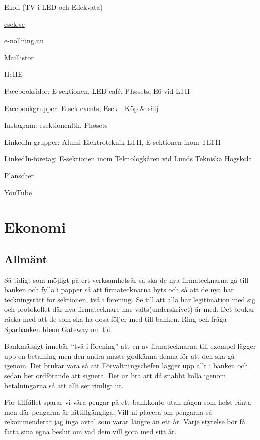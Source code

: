\documentclass[10pt]{article}
\begin{document}
\begin{dashlist}
    \item Ekoli (TV i LED och Edekvata)
    \item \url{esek.se}
    \item \url{e-nollning.nu}
    \item Maillistor
    \item HeHE
    \item Facebooksidor: E-sektionen, LED-café, Ph\o sets, E6 vid LTH
    \item Facebookgrupper: E-sek events, Esek - Köp \& sälj
    \item Instagram: esektionenlth, Ph\o sets
    \item LinkedIn-grupper: Alumi Elektroteknik LTH, E-sektionen inom TLTH
    \item LinkedIn-företag: E-sektionen inom Teknologkåren vid Lunds Tekniska Högskola
    \item Planscher
    \item YouTube
\end{dashlist}

\section{Ekonomi}

\subsection{Allmänt}

Så tidigt som möjligt på ert verksamhetsår så ska de nya firmatecknarna gå till banken och fylla i papper så att firmatecknarna byts och så att de nya har teckningsrätt för sektionen, två i förening. Se till att alla har legitimation med sig och protokollet där nya firmatecknare har valts(underskrivet) är med. Det brukar räcka med att de som ska ha dosa följer med till banken. Ring och fråga Sparbanken Ideon Gateway om tid.

Bankmässigt innebär ``två i förening'' att en av firmatecknarna till exempel lägger upp en betalning men den andra måste godkänna denna för att den ska gå igenom. Det brukar vara så att Förvaltningschefen lägger upp allt i banken och sedan ber ordförande att signera. Det är bra att då snabbt kolla igenom betalningarna så att allt ser rimligt ut.

För tillfället sparar vi våra pengar på ett bankkonto utan någon som helst ränta men där pengarna är lättillgängliga. Vill ni placera om pengarna så rekommenderar jag inga avtal som varar längre än ett år. Varje styrelse bör få fatta sina egna beslut om vad dem vill göra med sitt år.
\end{document}
